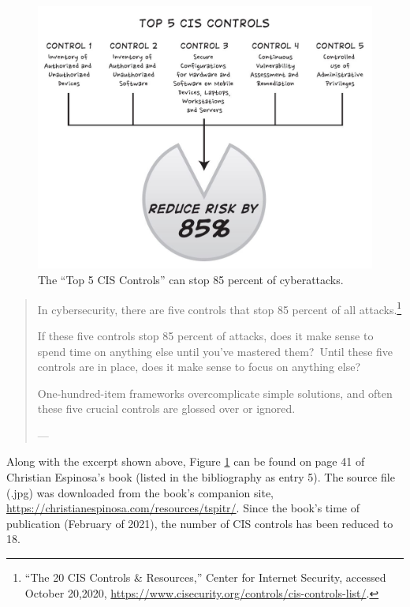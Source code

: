 \begin{figure}[h!] 
\centering
\includegraphics[scale=0.45]{./figures/fig6.jpg}
\caption{The ``Top 5 CIS Controls'' can stop 85 percent of cyberattacks.}
\label{fig:Fig2}
\end{figure}
\vspace{10pt}

\begin{formal}
    
\begin{quote} 
\begin{minipage}{\linewidth}
\renewcommand\thempfootnote{\textcolor{orange}{\arabic{footnote}}}

In cybersecurity, there are five controls that stop 85 percent of all attacks.\footnote{``The 20 CIS Controls \& Resources,'' Center for Internet Security, accessed October 20,2020, 
\url{https://www.cisecurity.org/controls/cis-controls-list/}.}
\vspace{10pt}

If these five controls stop 85 percent of attacks, does it make sense to spend time on anything else until you've mastered them?\ Until these five controls are in place, does it make sense to focus on anything else?
\vspace{10pt}

One-hundred-item frameworks overcomplicate simple solutions, and often these five crucial controls are glossed over or ignored.

\hfill
---\cite{Espinosa2021-is}
\end{minipage}
\end{quote}
\end{formal}

Along with the excerpt shown above, Figure \ref{fig:Fig2} can be found on page 41 of Christian Espinosa's book (listed in the bibliography as entry 5). The source file (.jpg) was downloaded from the book's companion site, \url{https://christianespinosa.com/resources/tspitr/}. Since the book's time of publication (February of 2021), the number of CIS controls has been reduced to 18.

